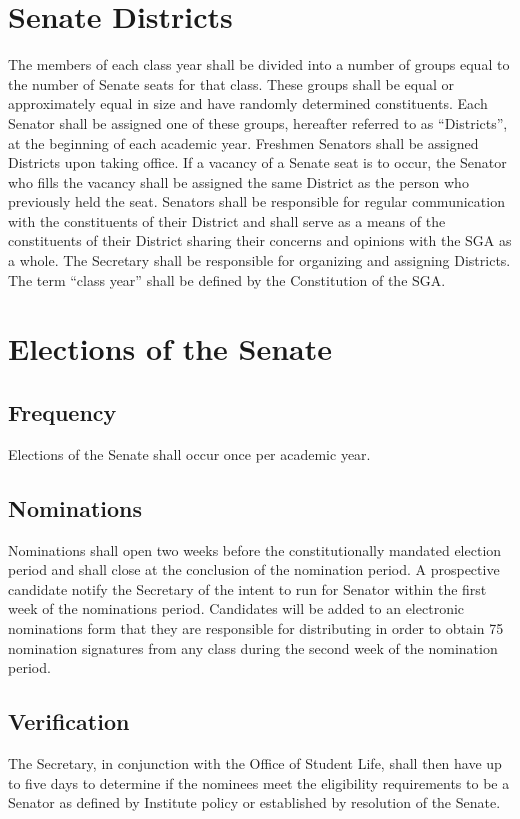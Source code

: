 \documentclass[12pt]{scrreprt}
\begin{document}
\section{Senate Districts}
The members of each class year shall be divided into a number of groups equal to the number of Senate seats for that class. These groups shall be equal or approximately equal in size and have randomly determined constituents. Each Senator shall be assigned one of these groups, hereafter referred to as “Districts”, at the beginning of each academic year. Freshmen Senators shall be assigned Districts upon taking office. If a vacancy of a Senate seat is to occur, the Senator who fills the vacancy shall be assigned the same District as the person who previously held the seat. Senators shall be responsible for regular communication with the constituents of their District and shall serve as a means of the constituents of their District sharing their concerns and opinions with the SGA as a whole. The Secretary shall be responsible for organizing and assigning Districts. The term “class year” shall be defined by the Constitution of the SGA.

\section{Elections of the Senate}

\subsection{Frequency}
Elections of the Senate shall occur once per academic year. 

\subsection{Nominations}
Nominations shall open two weeks before the constitutionally mandated election 
period and shall close at the conclusion of the nomination period. A prospective candidate notify the Secretary of the intent to run for Senator within the first week of the nominations period. Candidates will be added to an electronic nominations form that they are responsible for distributing in order to obtain 75 nomination signatures from any class during the second week of the nomination period.

\subsection{Verification} \label{sec:election_verification}
The Secretary, in conjunction with the Office of Student Life, shall then have 
up to five days to determine if the nominees meet the eligibility requirements to be 
a Senator as defined by Institute policy or established by resolution of the 
Senate. 
\end{document}
